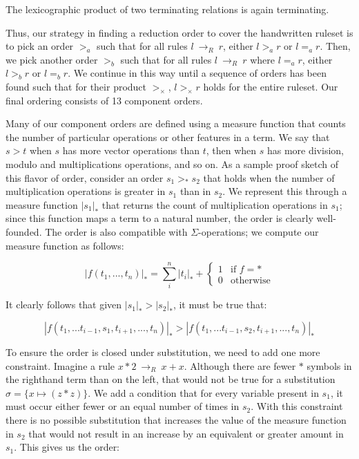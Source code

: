 \documentclass[acmsmall,review]{acmart}\settopmatter{printfolios=true,printccs=false,printacmref=false}
\newcommand{\rewrites}[0]{\:\rightarrow_{R}\:}
\begin{document}
\begin{theorem}
The lexicographic product of two terminating relations is again terminating.
\end{theorem}

Thus, our strategy in finding a reduction order to cover the handwritten ruleset is to pick an order $>_a$ such that for all rules $l \rewrites r$, either $l >_a r$ or $l =_a r$. Then, we pick another order $>_b$ such that for all rules $l \rewrites r$ where $l =_a r$, either $l >_b r$ or $l =_b r$. We continue in this way until a sequence of orders has been found such that for their product $>_{\times}$, $l >_{\times} r$ holds for the entire ruleset.  Our final ordering consists of 13 component orders.

Many of our component orders are defined using a measure function that counts the number of particular operations or other features in a term. We say that $s > t$ when $s$ has more vector operations than $t$, then when $s$ has more division, modulo and multiplications operations, and so on. As a sample proof sketch of this flavor of order, consider an order $s_1 >_* s_2$ that holds when the number of multiplication operations is greater in $s_1$ than in $s_2$. We represent this through a measure function $|s_1|_*$ that returns the count of multiplication operations in $s_1$; since this function maps a term to a natural number, the order is clearly well-founded. The order is also compatible with $\Sigma$-operations; we compute our measure function as follows:


\[
|f(t_1,...,t_n)|_* = \sum_i^n |t_i|_* + \begin{cases} 1 & \textrm{if } f = * \\
                                                      0 & \textrm{otherwise}
                                        \end{cases}
\]

It clearly follows that given $|s_1|_* > |s_2|_*$, it must be true that:

\[
|f(t_1,...t_{i-1},s_1,t_{i+1},...,t_n)|_* > |f(t_1,...t_{i-1},s_2,t_{i+1},...,t_n)|_*
\]

To ensure the order is closed under substitution, we need to add one more constraint. Imagine a rule $x * 2 \rewrites x + x$. Although there are fewer $*$ symbols in the righthand term than on the left, that would not be true for a substitution $\sigma = \{x \mapsto (z * z)\}$. We add a condition that for every variable present in $s_1$, it must occur either fewer or an equal number of times in $s_2$. With this constraint there is no possible substitution that increases the value of the measure function in $s_2$ that would not result in an increase by an equivalent or greater amount in $s_1$. This gives us the order:
\end{document}
